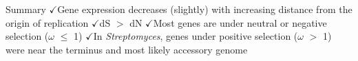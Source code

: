 \documentclass{beamer}
\newcommand{\strep}{\textit{Streptomyces}\xspace}
\newcommand{\ch}{$\checkmark$}
\newcommand\FourQuad[4]{%
	\begin{minipage}[b][.35\textheight][t]{.47\textwidth}#1\end{minipage}\hfill%
	\begin{minipage}[b][.35\textheight][t]{.47\textwidth}#2\end{minipage}\\[0.5em]
	\begin{minipage}[b][.35\textheight][t]{.47\textwidth}#3\end{minipage}\hfill
	\begin{minipage}[b][.35\textheight][t]{.47\textwidth}#4\end{minipage}%
}
\begin{document}
\begin{frame}{Summary}
	\ch Gene expression decreases (slightly) with increasing distance from the origin of replication
	\ch dS $>$ dN
	\ch Most genes are under neutral or negative selection ($\omega$ $\le$ 1)
	\ch In \strep, genes under positive selection ($\omega$ $>$ 1) were near the terminus and most likely accessory genome
\end{frame}
%
%		
%
%
%		
%
%		
\end{document}
